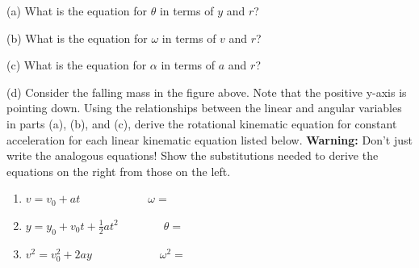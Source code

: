 (a) What is the equation for \( \theta  \) in terms of $y$ and $r$?
\vspace{10mm}

(b) What is the equation for \( \omega  \) in terms of $v$ and $r$?
\vspace{10mm}

(c) What is the equation for \( \alpha  \) in terms of $a$ and $r$?
\vspace{10mm}

(d) Consider the falling mass in the figure above. Note that the positive 
y-axis is pointing down. Using the 
relationships between the linear and angular variables in parts (a), (b), and 
(c), derive the rotational kinematic equation for constant acceleration for 
each linear kinematic equation listed below. \textbf{Warning:} Don't just write
the analogous equations! Show the substitutions needed to derive the equations
on the right from those on the left.

\begin{enumerate}
\item \( v=v_{0}+at\qquad \qquad \qquad \omega = \)\vspace{20mm}

\item \( y=y_{0}+v_{0}t+\frac{1}{2}at^{2}\qquad \qquad \theta = \)\vspace{20mm}

\item \( v^{2}=v_{0}^{2}+2ay\qquad \qquad \qquad \omega ^{2}= \)
\end{enumerate}

